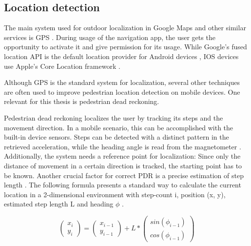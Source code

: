 

\subsection{Location detection}
The main system used for outdoor localization in Google Maps and other similar services is GPS \cite{google_maps}. During usage of the navigation app, the user gets the opportunity to activate it and give permission for its usage. While Google's fused location API is the default location provider for Android devices \cite{fused_location_api}, IOS devices use Apple's Core Location framework \cite{core_location_framework}.

Although GPS is the standard system for localization, several other techniques are often used to improve pedestrian location detection on mobile devices. One relevant for this thesis is pedestrian dead reckoning.

Pedestrian dead reckoning localizes the user by tracking its steps and the movement direction. In a mobile scenario, this can be accomplished with the built-in device sensors. Steps can be detected with a distinct pattern in the retrieved acceleration, while the heading angle is read from the magnetometer \cite{PDR}. Additionally, the system needs a reference point for localization: Since only the distance of movement in a certain direction is tracked, the starting point has to be known. Another crucial factor for correct PDR is a precise estimation of step length \cite{PDR}. The following formula presents a standard way to calculate the current location in a 2-dimensional environment with step-count i, position (x, y), estimated step length L and heading $\phi$ \cite{PDR_2}.

\begin{equation}
    \begin{pmatrix}x_{i}\\y_{i}\end{pmatrix} = \begin{pmatrix}x_{i-1}\\y_{i-1}\end{pmatrix} + L * \begin{pmatrix}sin(\phi_{i-1})\\cos(\phi_{i-1})\end{pmatrix}
\end{equation}

